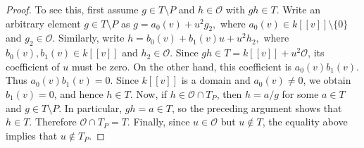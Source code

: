 \documentclass[11pt,a4paper]{amsart}
\numberwithin{equation}{section}
\begin{document}
\begin{proof}
To see this, first assume $g\in T\setminus P$ and $h\in 	\mathcal{O}$ with $gh\in T$.	Write an arbitrary element $g\in T\setminus P$ as
$g=a_0(v)+u^2g_2,$	where $a_0(v)\in k[[v]]\setminus\{0\}$ and $g_2\in\mathcal O$.	Similarly, write
$h=b_0(v)+b_1(v)u+u^2h_2,$	where $b_0(v),b_1(v)\in k[[v]]$ and $h_2\in\mathcal O$.	Since $gh\in T=k[[v]]+u^2\mathcal O$, its coefficient	of $u$ must be zero. On the other hand, this coefficient is	$a_0(v)b_1(v)$. Thus
$a_0(v)b_1(v)=0.$	Since $k[[v]]$ is a domain and $a_0(v)\neq 0$, we obtain	$b_1(v)=0$, and hence $h\in T$.
Now, if $h\in\mathcal O\cap T_P$, then $h=a/g$ for some	$a\in T$ and $g\in T\setminus P$. In particular, $gh=a\in T$,	so the preceding argument shows that $h\in T$. Therefore
$\mathcal O\cap T_P=T.$	Finally, since $u\in\mathcal O$ but $u\notin T$, the equality	above implies that $u\notin T_P$.
\end{proof}
\end{document}
